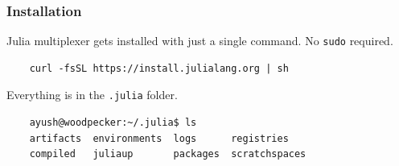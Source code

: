 \documentclass[aspectratio=169]{beamer} %
\begin{document}
\begin{frame}
  \vfill

  \vfill

\end{frame}

\begin{frame}[fragile]
  \frametitle{Installation}
  Julia multiplexer gets installed with just a single command. No \verb|sudo| required.  
  \begin{verbatim}
    curl -fsSL https://install.julialang.org | sh
  \end{verbatim}

  Everything is in the \verb|.julia| folder. 
  \begin{verbatim}
    ayush@woodpecker:~/.julia$ ls
    artifacts  environments  logs      registries
    compiled   juliaup       packages  scratchspaces
  \end{verbatim}

\end{frame}
\end{document}
